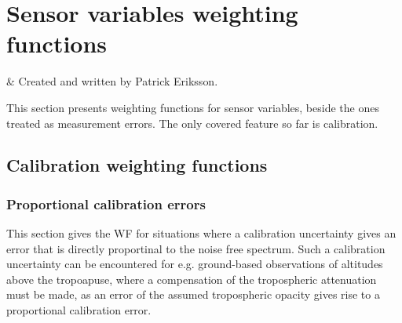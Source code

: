 %
%
\chapter{Sensor variables weighting functions}
 \label{sec:wfuns_sens}


%
%
 & Created and written by Patrick Eriksson.\\
\stophistory


%
%
%



%
%
This section presents weighting functions for sensor variables, beside the
ones treated as measurement errors. The only covered feature so far is calibration.




\section{Calibration weighting functions}
 \label{sec:wfuns_sens:cal}
 
 \subsection{Proportional calibration errors} 
 This section gives the WF for situations where a calibration
 uncertainty gives an error that is directly proportinal to the noise
 free spectrum.  Such a calibration uncertainty can be encountered for
 e.g. ground-based observations of altitudes above the tropoapuse,
 where a compensation of the tropospheric attenuation must be made, as an
 error of the assumed tropospheric opacity gives rise to a proportional 
 calibration error.

